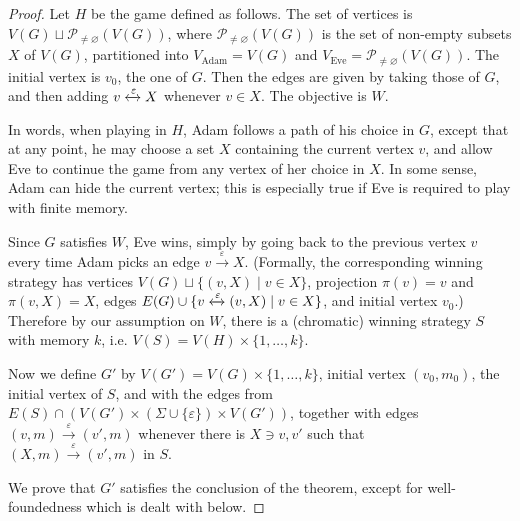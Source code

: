\documentclass[a4paper,UKenglish,cleveref, thm-restate]{lipics-v2021}
\newcommand{\re}[1]{\xrightarrow{#1}}
\newcommand{\rer}[1]{\xleftrightarrow{#1}}
\newcommand{\tin}{\text{ in }}
\newcommand{\eps}{\varepsilon}
\newcommand{\Eve}{\text{Eve}}
\newcommand{\Adam}{\text{Adam}}
\newcommand{\powne}[1]{\mathcal P_{\neq \varnothing}(#1)}
\begin{document}
\begin{proof}
    Let $H$ be the game defined as follows.
    The set of vertices is $V(G) \sqcup \powne{V(G)}$, where $\powne{V(G)}$ is the set of non-empty subsets $X$ of $V(G)$, partitioned into $V_\Adam = V(G)$ and $V_\Eve=\powne{V(G)}$.
    The initial vertex is $v_0$, the one of $G$.
    Then the edges are given by taking those of $G$, and then adding $v \rer \eps X$ whenever $v \in X$.
    The objective is $W$.

    In words, when playing in $H$, Adam follows a path of his choice in $G$, except that at any point, he may choose a set $X$ containing the current vertex $v$, and allow Eve to continue the game from any vertex of her choice in $X$.
    In some sense, Adam can hide the current vertex; this is especially true if Eve is required to play with finite memory.

    Since $G$ satisfies $W$, Eve wins, simply by going back to the previous vertex $v$ every time Adam picks an edge $v \re \eps X$.
    (Formally, the corresponding winning strategy has vertices $V(G) \sqcup \{(v,X) \mid v \in X\}$, projection $\pi(v)=v$ and $\pi(v,X)=X$, edges $E(G) \cup \{v \rer \eps (v,X) \mid v \in X\}$, and initial vertex $v_0$.)
    Therefore by our assumption on $W$, there is a (chromatic) winning strategy $S$ with memory $k$, i.e. $V(S)=V(H) \times \{1,\dots,k\}$.
    
    Now we define $G'$ by $V(G')=V(G) \times \{1,\dots,k\}$, initial vertex $(v_0,m_0)$, the initial vertex of $S$, and with the edges from $E(S) \cap (V(G') \times (\Sigma \cup \{\eps\}) \times V(G'))$, together with edges $(v,m) \re \eps (v',m)$ whenever there is $X \ni v,v'$ such that $(X,m) \re \eps (v',m) \tin S$.

    We prove that $G'$ satisfies the conclusion of the theorem, except for well-foundedness which is dealt with below.


\end{proof}
\end{document}
